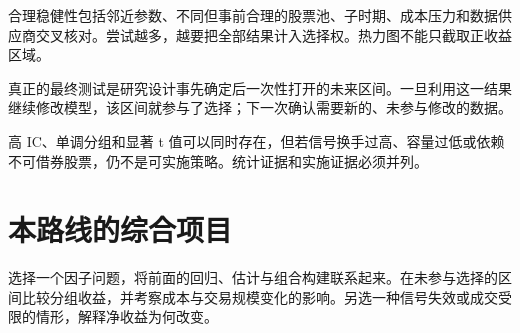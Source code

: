 
合理稳健性包括邻近参数、不同但事前合理的股票池、子时期、成本压力和数据供应商交叉核对。尝试越多，越要把全部结果计入选择权。热力图不能只截取正收益区域。

真正的最终测试是研究设计事先确定后一次性打开的未来区间。一旦利用这一结果继续修改模型，该区间就参与了选择；下一次确认需要新的、未参与修改的数据。

\begin{diagnostic}
高 IC、单调分组和显著 t 值可以同时存在，但若信号换手过高、容量过低或依赖不可借券股票，仍不是可实施策略。统计证据和实施证据必须并列。
\end{diagnostic}

\section{本路线的综合项目}

选择一个因子问题，将前面的回归、估计与组合构建联系起来。在未参与选择的区间比较分组收益，并考察成本与交易规模变化的影响。另选一种信号失效或成交受限的情形，解释净收益为何改变。




